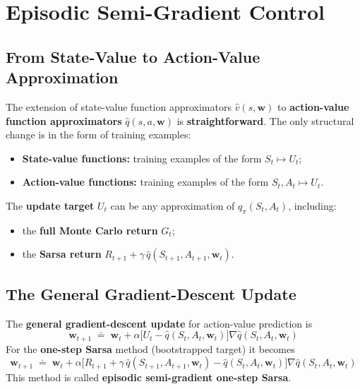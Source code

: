 \documentclass[11pt,a4paper]{article}
\theoremstyle{definition}
\theoremstyle{plain}
\theoremstyle{remark}
\begin{document}
\section{Episodic Semi-Gradient Control}

\subsection{From State-Value to Action-Value Approximation}

The extension of state-value function approximators $\hat{v}(s, \mathbf{w})$ to \textbf{action-value function approximators} $\hat{q}(s, a, \mathbf{w})$ is \textbf{straightforward}. The only structural change is in the form of training examples:
\begin{itemize}
    \item \textbf{State-value functions:} training examples of the form $S_t \mapsto U_t$;
    \item \textbf{Action-value functions:} training examples of the form $S_t, A_t \mapsto U_t$.
\end{itemize}

The \textbf{update target} $U_t$ can be any approximation of $q_\pi(S_t, A_t)$, including:
\begin{itemize}
    \item the \textbf{full Monte Carlo return} $G_t$;
    \item the \textbf{Sarsa return} $R_{t+1} + \gamma\, \hat{q}(S_{t+1}, A_{t+1}, \mathbf{w}_t)$.
\end{itemize}

\subsection{The General Gradient-Descent Update}

The \textbf{general gradient-descent update} for action-value prediction is
\[
    \boxed{\;\mathbf{w}_{t+1} \;\doteq\; \mathbf{w}_t + \alpha \bigl[U_t - \hat{q}(S_t, A_t, \mathbf{w}_t)\bigr] \nabla \hat{q}(S_t, A_t, \mathbf{w}_t)\;}
\]
For the \textbf{one-step Sarsa} method (bootstrapped target) it becomes
\[
    \boxed{\;\mathbf{w}_{t+1} \;\doteq\; \mathbf{w}_t + \alpha \bigl[R_{t+1} + \gamma\, \hat{q}(S_{t+1}, A_{t+1}, \mathbf{w}_t) - \hat{q}(S_t, A_t, \mathbf{w}_t)\bigr] \nabla \hat{q}(S_t, A_t, \mathbf{w}_t)\;}
\]
This method is called \textbf{episodic semi-gradient one-step Sarsa}.
\end{document}
